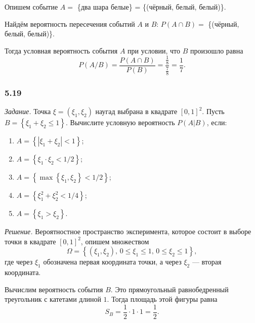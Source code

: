 Опишем событие $A =$ \{два шара белые\} = \{(чёрный, белый, белый)\}.

Найдём вероятность пересечения событий $A$ и $B: \, P \left( A \cap B \right) =$ \{(чёрный, белый, белый)\}.

Тогда условная вероятность события $A$ при условии, что $B$ произошло равна
$$P \left( A/B \right) =
\frac{P \left( A \cap B \right) }{P \left( B \right) } =
\frac{ \frac{1}{8} }{ \frac{7}{8} } =
\frac{1}{7}.$$

\subsubsection*{5.19}

\textit{Задание.} Точка $ \xi = \left( \xi_1, \xi_2 \right) $ наугад выбрана в квадрате $ \left[ 0, 1 \right]^2$.
Пусть $B = \left\{ \xi_1 + \xi_2 \leq 1 \right\} $.
Вычислите условную вероятность $P \left( \left. A \right| B \right) $, если:
\begin{enumerate}[label=\alph*)]
\item $A = \left\{ \left| \xi_1 + \xi_2 \right| < 1 \right\} $;
\item $A = \left\{ \xi_1 \cdot \xi_2 < 1/2 \right\} $;
\item $A = \left\{ \max \left\{ \xi_1, \xi_2 \right\} < 1/2 \right\} $;
\item $A = \left\{ \xi_1^2 + \xi_2^2 < 1/4 \right\} $;
\item $A = \left\{ \xi_1 > \xi_2 \right\} $.
\end{enumerate}

\textit{Решение.}
Вероятностное пространство эксперимента,
которое состоит в выборе точки в квадрате
$ \left[ 0, 1 \right]^2$, опишем множеством
$$ \Omega =
\left\{ \left( \xi_1, \xi_2 \right), \,
0 \leq \xi_1 \leq 1, \,
0 \leq \xi_2 \leq 1 \right\},$$
где через $ \xi_1$ обозначена первая координата точки, а через $ \xi_2$ --- вторая координата.

Вычислим вероятность события $B$.
Это прямоугольный равнобедренный треугольник с катетами длиной $1$.
Тогда площадь этой фигуры равна
$$S_B =
\frac{1}{2} \cdot 1 \cdot 1 =
\frac{1}{2}.$$

